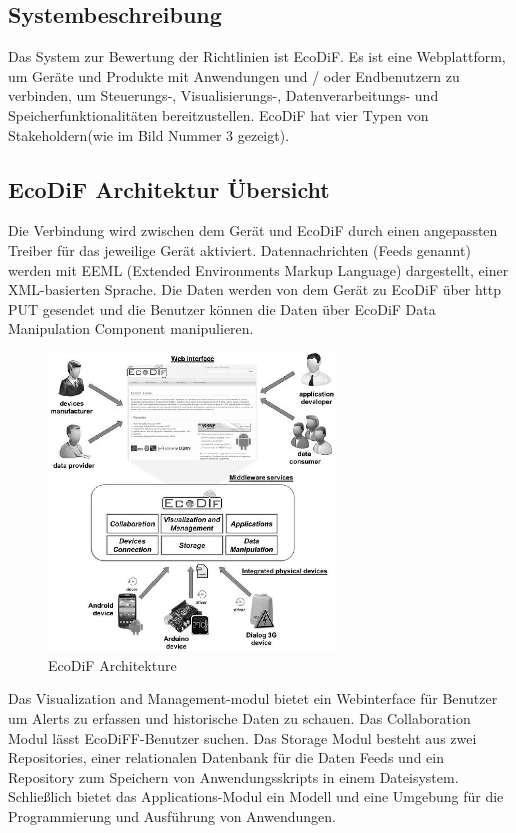 \documentclass{acmsiggraph}
\begin{document}
\subsection{Systembeschreibung}
Das System zur Bewertung der Richtlinien ist EcoDiF.
Es ist eine Webplattform, um Geräte und Produkte mit Anwendungen und / oder Endbenutzern zu verbinden, um Steuerungs-, Visualisierungs-, Datenverarbeitungs- und Speicherfunktionalitäten bereitzustellen. EcoDiF hat vier Typen von Stakeholdern(wie im Bild Nummer 3 gezeigt).
\subsection{EcoDiF Architektur Übersicht}
Die Verbindung wird zwischen dem Gerät und EcoDiF durch einen angepassten Treiber für das jeweilige Gerät aktiviert.
Datennachrichten (Feeds genannt) werden mit EEML (Extended Environments Markup Language)    
 \cite{EEML} dargestellt, einer XML-basierten Sprache. 
Die Daten werden von dem Gerät zu EcoDiF über http PUT gesendet und die Benutzer können die Daten über EcoDiF Data Manipulation Component manipulieren.
\begin{figure}[ht]
  \centering
  \includegraphics[width=3.0in]{images/eco_dif_archi}
  \caption{EcoDiF Architekture}
  \label{fig:ecoDiF_Architecture}
\end{figure}
Das Visualization and Management-modul bietet ein Webinterface für Benutzer um Alerts zu erfassen und historische Daten zu schauen.
Das Collaboration Modul lässt EcoDiFF-Benutzer suchen. Das Storage Modul besteht aus zwei Repositories, einer relationalen Datenbank für die Daten Feeds und ein Repository zum Speichern von Anwendungsskripts in einem Dateisystem.
Schließlich bietet das Applications-Modul ein Modell und eine Umgebung für die Programmierung und Ausführung von Anwendungen.
\end{document}
